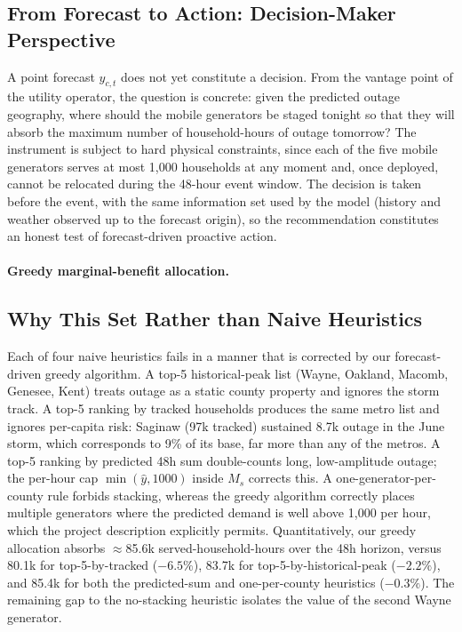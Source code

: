 \documentclass[11pt]{article}
\begin{document}
\subsection{From Forecast to Action: Decision-Maker Perspective}
A point forecast $\hat y_{c,t}$ does not yet constitute a decision.
From the vantage point of the utility operator, the question is
concrete: given the predicted outage geography, where should the
mobile generators be staged tonight so that they will absorb the
maximum number of household-hours of outage tomorrow? The instrument
is subject to hard physical constraints, since each of the five mobile
generators serves at most 1{,}000 households at any moment and, once
deployed, cannot be relocated during the 48-hour event window. The
decision is taken before the event, with the same information set used
by the model (history and weather observed up to the forecast origin),
so the recommendation constitutes an honest test of forecast-driven
proactive action.

\paragraph{Greedy marginal-benefit allocation.}


\subsection{Why This Set Rather than Naive Heuristics}
Each of four naive heuristics fails in a manner that is corrected by
our forecast-driven greedy algorithm. A top-5 historical-peak list
(Wayne, Oakland, Macomb, Genesee, Kent) treats outage as a static
county property and ignores the storm track. A top-5 ranking by tracked
households produces the same metro list and ignores per-capita risk:
Saginaw (97k tracked) sustained 8.7k outage in the June storm, which
corresponds to 9\% of its base, far more than any of the metros. A
top-5 ranking by predicted 48h sum double-counts long, low-amplitude
outage; the per-hour cap $\min(\hat y, 1000)$ inside $M_s$ corrects
this. A one-generator-per-county rule forbids stacking, whereas the
greedy algorithm correctly places multiple generators where the
predicted demand is well above 1{,}000 per hour, which the project
description explicitly permits. Quantitatively, our greedy allocation
absorbs $\approx$85.6k served-household-hours over the 48h horizon,
versus 80.1k for top-5-by-tracked ($-6.5\%$), 83.7k for
top-5-by-historical-peak ($-2.2\%$), and 85.4k for both the
predicted-sum and one-per-county heuristics ($-0.3\%$). The remaining
gap to the no-stacking heuristic isolates the value of the second
Wayne generator.
\end{document}
